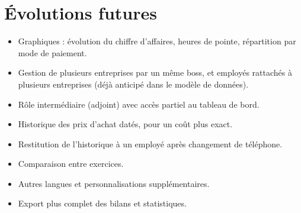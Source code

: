 \documentclass[11pt,a4paper]{article}
\begin{document}
	\section{Évolutions futures}
	\begin{itemize}[leftmargin=*]
		\item Graphiques : évolution du chiffre d'affaires, heures de pointe, répartition par mode de paiement.
		\item Gestion de plusieurs entreprises par un même boss, et employés rattachés à plusieurs entreprises (déjà anticipé dans le modèle de données).
		\item Rôle intermédiaire (adjoint) avec accès partiel au tableau de bord.
		\item Historique des prix d'achat datés, pour un coût plus exact.
		\item Restitution de l'historique à un employé après changement de téléphone.
		\item Comparaison entre exercices.
		\item Autres langues et personnalisations supplémentaires.
		\item Export plus complet des bilans et statistiques.
	\end{itemize}
	
\end{document}
